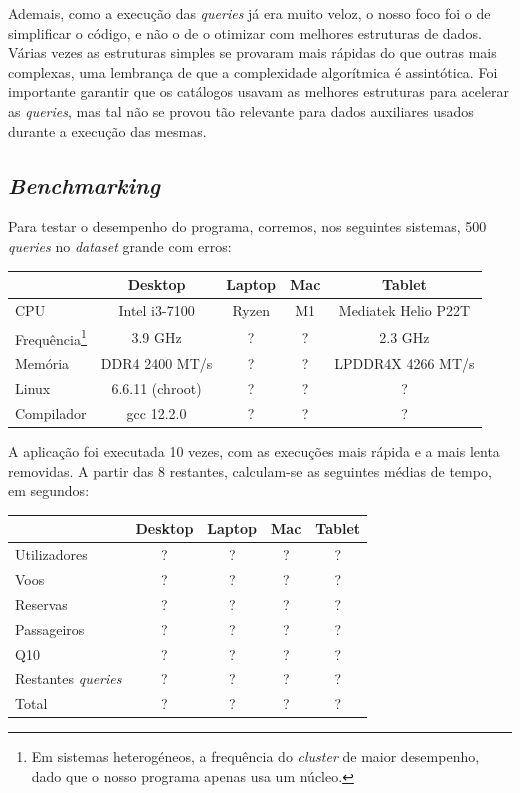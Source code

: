 \documentclass[11pt, a4paper]{article}
\begin{document}
Ademais, como a execução das \emph{queries} já era muito veloz, o nosso foco foi o de simplificar
o código, e não o de o otimizar com melhores estruturas de dados. Várias vezes as estruturas simples
se provaram mais rápidas do que outras mais complexas, uma lembrança de que a complexidade
algorítmica é assintótica. Foi importante garantir que os catálogos usavam as
melhores estruturas para acelerar as \emph{queries}, mas tal não se provou tão relevante para dados
auxiliares usados durante a execução das mesmas.

\subsection{\emph{Benchmarking}}
\label{sec:benchmarking}

Para testar o desempenho do programa, corremos, nos seguintes sistemas, 500 \emph{queries} no
\emph{dataset} grande com erros:

\begin{center}
    \begin{tabular}{|l|c|c|c|c|}
        \hline
        & Desktop & Laptop & Mac & Tablet \\
        \hline
        CPU & Intel i3-7100 & Ryzen & M1 & Mediatek Helio P22T \\
        \hline
        Frequência\footnote{Em sistemas heterogéneos, a frequência do \emph{cluster} de maior
                            desempenho, dado que o nosso programa apenas usa um núcleo.} &
        3.9 GHz & ? & ? & 2.3 GHz \\
        \hline
        Memória & DDR4 2400 MT/s & ? & ? & LPDDR4X 4266 MT/s \\
        \hline
        Linux & 6.6.11 (chroot) & ? & ? & ? \\
        \hline
        Compilador & gcc 12.2.0 & ? & ? & ? \\
        \hline
    \end{tabular}
\end{center}

A aplicação foi executada 10 vezes, com as execuções mais rápida e a mais lenta removidas. A partir
das 8 restantes, calculam-se as seguintes médias de tempo, em segundos:

\begin{center}
    \begin{tabular}{|l|c|c|c|c|}
        \hline
        & Desktop & Laptop & Mac & Tablet \\
        \hline
        Utilizadores & ? & ? & ? & ? \\
        \hline
        Voos & ? & ? & ? & ? \\
        \hline
        Reservas & ? & ? & ? & ? \\
        \hline
        Passageiros & ? & ? & ? & ? \\
        \hline
        Q10 & ? & ? & ? & ? \\
        \hline
        Restantes \emph{queries} & ? & ? & ? & ? \\
        \hline
        Total & ? & ? & ? & ? \\
        \hline
    \end{tabular}
\end{center}
\end{document}
